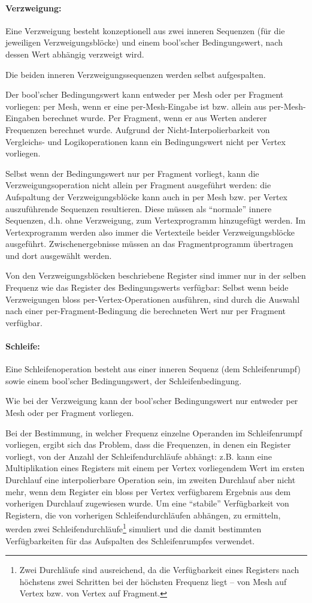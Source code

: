 \documentclass[twoside,a4paper,fleqn,12pt]{book}
\begin{document}
\paragraph{Verzweigung:} Eine Verzweigung besteht konzeptionell aus zwei inneren Sequenzen (für die jeweiligen Verzweigungsblöcke)
und einem bool'scher Bedingungswert, nach dessen Wert abhängig verzweigt wird.

Die beiden inneren Verzweigungssequenzen werden selbst aufgespalten.

Der bool'scher Bedingungswert kann entweder per Mesh oder per Fragment vorliegen: per Mesh, wenn er eine per-Mesh-Eingabe ist bzw. allein aus
per-Mesh-Eingaben berechnet wurde. Per Fragment, wenn er aus Werten anderer Frequenzen berechnet wurde.
Aufgrund der Nicht-Interpolierbarkeit von Vergleichs- und Logikoperationen kann ein Bedingungswert nicht per Vertex vorliegen.

Selbst wenn der Bedingungswert nur per Fragment vorliegt, kann die Verzweigungsoperation nicht allein per Fragment ausgeführt werden:
die Aufspaltung der Verzweigungsblöcke kann auch in per Mesh bzw. per Vertex auszuführende Sequenzen resultieren. Diese müssen als "`normale"'
innere Sequenzen, d.h. ohne Verzweigung, zum Vertexprogramm hinzugefügt werden. Im Vertexprogramm werden also immer
die Vertexteile beider Verzweigungsblöcke ausgeführt. Zwischenergebnisse müssen an das Fragmentprogramm übertragen und dort ausgewählt werden.

Von den Verzweigungsblöcken beschriebene Register sind immer nur in der selben Frequenz wie das Register des Bedingungswerts verfügbar:
Selbst wenn beide Verzweigungen bloss per-Vertex-Operationen ausführen, sind durch die Auswahl nach einer per-Fragment-Bedingung
die berechneten Wert nur per Fragment verfügbar.

\paragraph{Schleife:} Eine Schleifenoperation besteht aus einer inneren Sequenz (dem Schleifenrumpf) sowie
einem bool'scher Bedingungswert, der Schleifenbedingung.

Wie bei der Verzweigung kann der bool'scher Bedingungswert nur entweder per Mesh oder per Fragment vorliegen.

Bei der Bestimmung, in welcher Frequenz einzelne Operanden im Schleifenrumpf vorliegen,
ergibt sich das Problem, dass die Frequenzen, in denen ein Register vorliegt, von der Anzahl der Schleifendurchläufe
abhängt: z.B. kann eine Multiplikation eines Registers mit einem per Vertex vorliegendem Wert im ersten Durchlauf
eine interpolierbare Operation sein, im zweiten Durchlauf aber nicht mehr, wenn dem Register ein bloss per Vertex
verfügbarem Ergebnis aus dem vorherigen Durchlauf zugewiesen wurde.
Um eine "`stabile"' Verfügbarkeit von Registern, die von vorherigen Schleifendurchläufen abhängen, zu ermitteln,
werden zwei Schleifendurchläufe\footnote{Zwei Durchläufe sind ausreichend, da die Verfügbarkeit eines Registers
nach höchstens zwei Schritten bei der höchsten Frequenz liegt -- von Mesh auf Vertex bzw. von Vertex auf Fragment.}
simuliert und die damit bestimmten Verfügbarkeiten für das Aufspalten des Schleifenrumpfes verwendet.
\end{document}

